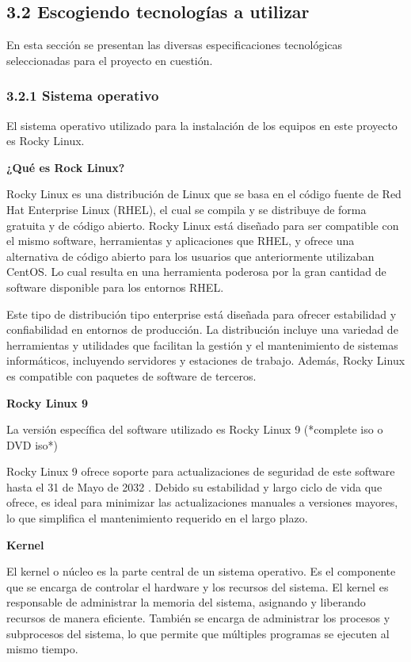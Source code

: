 \begin{spacing}{1.5}
  \subsection{3.2 Escogiendo tecnologías a utilizar}
  En esta sección se presentan las diversas especificaciones tecnológicas
  seleccionadas para el proyecto en cuestión.

  \subsubsection{3.2.1 Sistema operativo}
  El sistema operativo utilizado para la instalación de los equipos en este
  proyecto es Rocky Linux.

  \textbf{¿Qué es Rock Linux?}

  Rocky Linux es una distribución de Linux que se basa en el código fuente de
  Red Hat Enterprise Linux (RHEL), el cual se compila y se distribuye de forma
  gratuita y de código abierto. Rocky Linux está diseñado para ser compatible con
  el mismo software, herramientas y aplicaciones que RHEL, y ofrece una
  alternativa de código abierto para los usuarios que anteriormente utilizaban
  CentOS. Lo cual resulta en una herramienta poderosa por la gran cantidad de
  software disponible para los entornos RHEL.

  Este tipo de distribución tipo enterprise está diseñada para ofrecer
  estabilidad y confiabilidad en entornos de producción. La distribución incluye
  una variedad de herramientas y utilidades que facilitan la gestión y el
  mantenimiento de sistemas informáticos, incluyendo servidores y estaciones de
  trabajo. Además, Rocky Linux es compatible con paquetes de software de
  terceros. \cite{RL-1}

  \textbf{Rocky Linux 9}

  La versión específica del software utilizado es Rocky Linux 9 (*complete
  iso o DVD iso*) \cite{RL9-download-1} \cite{RL9-release-1}
  \cite{RHEL-release-1}

  Rocky Linux 9 ofrece soporte para actualizaciones de seguridad de este
  software hasta el 31 de Mayo de 2032 \cite{RL9-EOL-1}. Debido su estabilidad y
  largo ciclo de vida que ofrece, es ideal para minimizar las actualizaciones
  manuales a versiones mayores, lo que simplifica el mantenimiento requerido en
  el largo plazo.

  \textbf{Kernel}

  El kernel o núcleo es la parte central de un sistema operativo. Es el
  componente que se encarga de controlar el hardware y los recursos del sistema.
  El kernel es responsable de administrar la memoria del sistema, asignando y
  liberando recursos de manera eficiente. También se encarga de administrar los
  procesos y subprocesos del sistema, lo que permite que múltiples programas se
  ejecuten al mismo tiempo.


\end{spacing}
